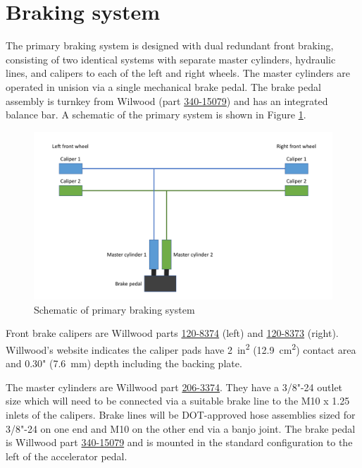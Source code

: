 \documentclass[10pt]{article}
\begin{document}
\section{Braking system}
The primary braking system is designed with dual redundant front braking, consisting of two identical systems with separate master cylinders, hydraulic lines, and calipers to each of the left and right wheels. The master cylinders are operated in unision via a single mechanical brake pedal. The brake pedal assembly is turnkey from Wilwood (part \href{http://www.wilwood.com/Pedals/PedalProd.aspx?itemno=340-15079}{340-15079}) and has an integrated balance bar. A schematic of the primary system is shown in Figure \ref{fig:primary-brakes-schematic}.

\begin{figure}[H]
\centering
\includegraphics[width=\textwidth]{figures/primary-brakes-schematic}
\caption{Schematic of primary braking system}
\label{fig:primary-brakes-schematic}
\end{figure}

Front brake calipers are Willwood parts \href{http://www.wilwood.com/Calipers/CaliperProd.aspx?itemno=120-8374}{120-8374} (left) and \href{http://www.wilwood.com/Calipers/CaliperProd.aspx?itemno=120-8373}{120-8373} (right). Willwood's website indicates the caliper pads have \SI{2}{in\squared} (\SI{12.9}{\centi\metre\squared}) contact area and 0.30" (\SI{7.6}{\milli\metre}) depth including the backing plate.

The master cylinders are Willwood part \href{http://www.wilwood.com/MasterCylinders/MasterCylinderProd.aspx?itemno=260-3374}{206-3374}. They have a 3/8"-24 outlet size which will need to be connected via a suitable brake line to the M10 x 1.25 inlets of the calipers. Brake lines will be DOT-approved hose assemblies sized for 3/8"-24 on one end and M10 on the other end via a banjo joint. The brake pedal is Willwood part \href{http://www.wilwood.com/Pedals/PedalProd.aspx?itemno=340-15079}{340-15079} and is mounted in the standard configuration to the left of the accelerator pedal.
\end{document}
